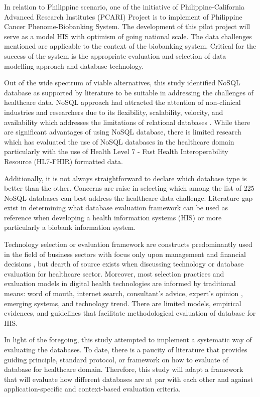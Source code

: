 \documentclass[5p]{elsarticle}
\begin{document}
In relation to Philippine scenario, one of the initiative of Philippine-California Advanced Research Institutes (PCARI) Project is to implement 
of Philippine Cancer Phenome-Biobanking System. The development of this pilot project will serve as a model HIS with optimism 
of going national scale. The data challenges mentioned are applicable to the context of the biobanking system. 
Critical for the success of the system is the appropriate evaluation and selection of data modelling approach and database technology.

Out of the wide spectrum of viable alternatives, this study identified NoSQL database as supported by literature to be suitable in addressing the challenges of 
healthcare data. NoSQL approach had attracted the attention of non-clinical industries \cite{C.S.Kruse201638,Z.Parker20131,G.D.Ferreira2013125} and researchers 
due to its flexibility, scalability, velocity, and availability which addresses the limitations of relational databases \cite{M.Ercan190510}. 
While there are significant advantages of using NoSQL database, there is limited research which has evaluated the use of NoSQL databases in the healthcare domain 
particularly with the use of Health Level 7 - Fast Health Interoperability Resource (HL7-FHIR) formatted data. 

Additionally, it is not always straightforward to declare which database type is better than the other. Concerns are raise in selecting which among 
the list of 225 NoSQL databases \cite{S.Edlich2018} can best address the healthcare data challenge. Literature gap exist in determining what database evaluation framework can be used as
reference when developing a health information systems (HIS) or more particularly a biobank information system.

Technology selection or evaluation framework are constructs predominantly used in the field of business sectors with focus only upon management and financial 
decisions \cite{C.Chan2010300}, but dearth of source exists when discussing technology or database evaluation for healthcare sector. Moreover, most selection 
practices and evaluation models in digital health technologies are informed by traditional means: word of mouth, internet search, consultant’s advice, expert’s opinion \cite{A.Ostrovsky20141}, 
emerging systems, and technology trend. There are limited models, empirical evidences, and guidelines that facilitate methodological evaluation of database for HIS.

In light of the foregoing, this study attempted to implement a systematic way of evaluating the databases. To date, there is a paucity of literature that provides guiding principle,
standard protocol, or framework on how to evaluate of database for healthcare domain.  Therefore, this study will adapt a framework that will evaluate how different 
databases are at par with each other and against application-specific and context-based evaluation criteria. 
\end{document}
